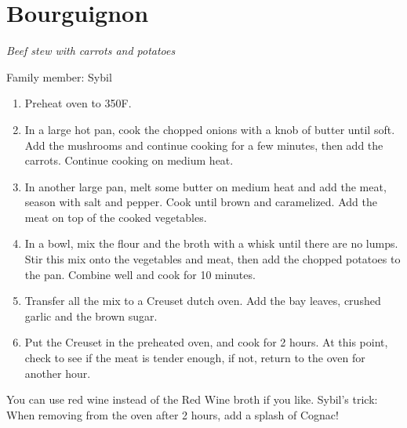 \chapter{Bourguignon}
\label{ch:bourguignon}



\textit{Beef stew with carrots and potatoes}

Family member: Sybil

\begin{enumerate}
    \item Preheat oven to 350\degree F.
    \item In a large hot pan, cook the chopped onions with a knob of butter until soft. Add the mushrooms and continue cooking for a few minutes, then add the carrots. Continue cooking on medium heat.
    \item In another large pan, melt some butter on medium heat and add the meat, season with salt and pepper. Cook until brown and caramelized. Add the meat on top of the cooked vegetables.
    \item In a bowl, mix the flour and the broth with a whisk until there are no lumps. Stir this mix onto the vegetables and meat, then add the chopped potatoes to the pan. Combine well and cook for 10 minutes.
    \item Transfer all the mix to a Creuset dutch oven. Add the bay leaves, crushed garlic and the brown sugar.
    \item Put the Creuset in the preheated oven, and cook for 2 hours. At this point, check to see if the meat is tender enough, if not, return to the oven for another hour.
\end{enumerate}

You can use red wine instead of the Red Wine broth if you like. Sybil's trick: When removing from the oven after 2 hours, add a splash of Cognac!
